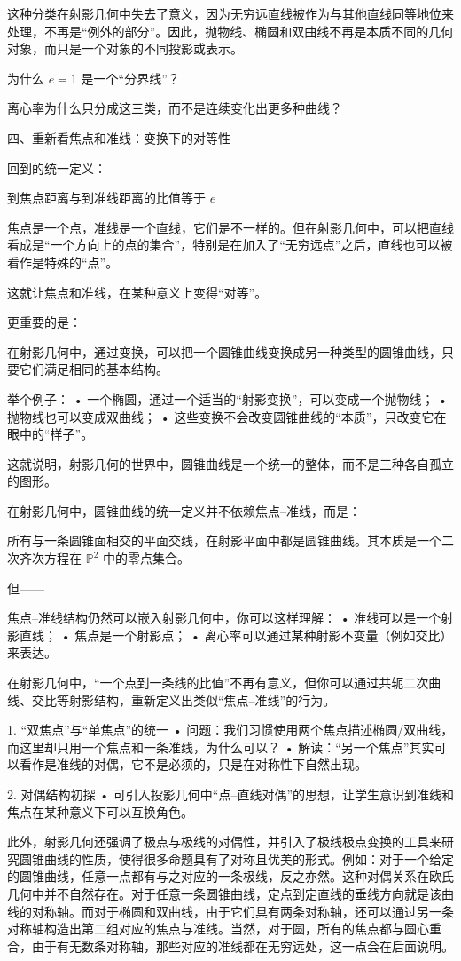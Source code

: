 这种分类在射影几何中失去了意义，因为无穷远直线被作为与其他直线同等地位来处理，不再是“例外的部分”。因此，抛物线、椭圆和双曲线不再是本质不同的几何对象，而只是一个对象的不同投影或表示。


为什么 $e=1$ 是一个“分界线”？

离心率为什么只分成这三类，而不是连续变化出更多种曲线？

四、重新看焦点和准线：变换下的对等性

回到的统一定义：

到焦点距离与到准线距离的比值等于 $e$

焦点是一个点，准线是一个直线，它们是不一样的。但在射影几何中，可以把直线看成是“一个方向上的点的集合”，特别是在加入了“无穷远点”之后，直线也可以被看作是特殊的“点”。

这就让焦点和准线，在某种意义上变得“对等”。

更重要的是：

在射影几何中，通过变换，可以把一个圆锥曲线变换成另一种类型的圆锥曲线，只要它们满足相同的基本结构。

举个例子：
	•	一个椭圆，通过一个适当的“射影变换”，可以变成一个抛物线；
	•	抛物线也可以变成双曲线；
	•	这些变换不会改变圆锥曲线的“本质”，只改变它在眼中的“样子”。

这就说明，射影几何的世界中，圆锥曲线是一个统一的整体，而不是三种各自孤立的图形。


在射影几何中，圆锥曲线的统一定义并不依赖焦点–准线，而是：

所有与一条圆锥面相交的平面交线，在射影平面中都是圆锥曲线。其本质是一个二次齐次方程在 $\mathbb{P}^2$ 中的零点集合。

但——

焦点–准线结构仍然可以嵌入射影几何中，你可以这样理解：
	•	准线可以是一个射影直线；
	•	焦点是一个射影点；
	•	离心率可以通过某种射影不变量（例如交比）来表达。

在射影几何中，“一个点到一条线的比值”不再有意义，但你可以通过共轭二次曲线、交比等射影结构，重新定义出类似“焦点–准线”的行为。

1. “双焦点”与“单焦点”的统一
	•	问题：我们习惯使用两个焦点描述椭圆/双曲线，而这里却只用一个焦点和一条准线，为什么可以？
	•	解读：“另一个焦点”其实可以看作是准线的对偶，它不是必须的，只是在对称性下自然出现。

2. 对偶结构初探
	•	可引入投影几何中“点–直线对偶”的思想，让学生意识到准线和焦点在某种意义下可以互换角色。

此外，射影几何还强调了极点与极线的对偶性，并引入了极线极点变换的工具来研究圆锥曲线的性质，使得很多命题具有了对称且优美的形式。例如：对于一个给定的圆锥曲线，任意一点都有与之对应的一条极线，反之亦然。这种对偶关系在欧氏几何中并不自然存在。对于任意一条圆锥曲线，定点到定直线的垂线方向就是该曲线的对称轴。而对于椭圆和双曲线，由于它们具有两条对称轴，还可以通过另一条对称轴构造出第二组对应的焦点与准线。当然，对于圆，所有的焦点都与圆心重合，由于有无数条对称轴，那些对应的准线都在无穷远处，这一点会在后面说明。